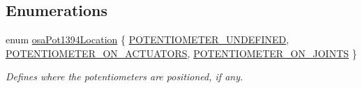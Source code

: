 \subsection*{Enumerations}
\begin{DoxyCompactItemize}
\item 
enum \hyperlink{namespacesaw_robot_i_o1394_a9d63d89648f679b6af5cf3f16576bde9}{osa\-Pot1394\-Location} \{ \hyperlink{namespacesaw_robot_i_o1394_a9d63d89648f679b6af5cf3f16576bde9a7b7ee7cf7008c6c75526a64b7c7e7ed2}{P\-O\-T\-E\-N\-T\-I\-O\-M\-E\-T\-E\-R\-\_\-\-U\-N\-D\-E\-F\-I\-N\-E\-D}, 
\hyperlink{namespacesaw_robot_i_o1394_a9d63d89648f679b6af5cf3f16576bde9a608b055081dce70b7bdd2aaa970b2f9a}{P\-O\-T\-E\-N\-T\-I\-O\-M\-E\-T\-E\-R\-\_\-\-O\-N\-\_\-\-A\-C\-T\-U\-A\-T\-O\-R\-S}, 
\hyperlink{namespacesaw_robot_i_o1394_a9d63d89648f679b6af5cf3f16576bde9a03bb052c9f73c37f3112cbc6af250398}{P\-O\-T\-E\-N\-T\-I\-O\-M\-E\-T\-E\-R\-\_\-\-O\-N\-\_\-\-J\-O\-I\-N\-T\-S}
 \}
\begin{DoxyCompactList}\small\item\em Defines where the potentiometers are positioned, if any. \end{DoxyCompactList}\end{DoxyCompactItemize}
